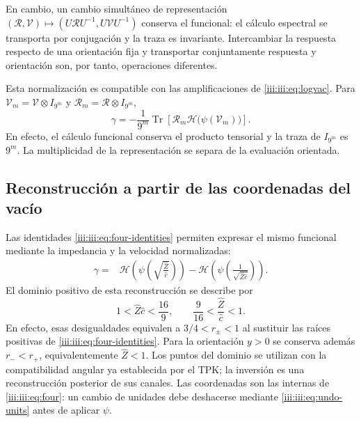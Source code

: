 En cambio, un cambio simultáneo de representación
$(\mathcal R,\mathcal V)\mapsto
(U\mathcal RU^{-1},U\mathcal VU^{-1})$ conserva el funcional:
el cálculo espectral se transporta por conjugación y la traza es
invariante. Intercambiar la respuesta respecto de una orientación fija
y transportar conjuntamente respuesta y orientación son, por tanto,
operaciones diferentes.

Esta normalización es compatible con las amplificaciones de
\eqref{iii:iii:eq:logvac}. Para
$\mathcal V_m=\mathcal V\otimes I_{9^m}$ y
$\mathcal R_m=\mathcal R\otimes I_{9^m}$,
\begin{equation}
 \gamma=-\frac1{9^m}\operatorname{Tr}
 \left[\mathcal R_m\mathcal H\bigl(\psi(\mathcal V_m)\bigr)\right].
 \label{iii:iii:eq:barbero-amplification}
\end{equation}
En efecto, el cálculo funcional conserva el producto tensorial y la traza
de $I_{9^m}$ es $9^m$. La multiplicidad de la representación se separa
de la evaluación orientada.

\subsection{Reconstrucción a partir de las coordenadas del vacío}

Las identidades \eqref{iii:iii:eq:four-identities} permiten expresar el mismo
funcional mediante la impedancia y la velocidad normalizadas:
\begin{align}
 \gamma={}&
 \mathcal H\!\left(\psi\!\left(
     \sqrt{\frac{\widehat Z}{\widehat c}}\right)\right)
 -\mathcal H\!\left(\psi\!\left(
     \frac1{\sqrt{\widehat Z\widehat c}}\right)\right).
 \label{iii:iii:eq:barbero-zc}
\end{align}
El dominio positivo de esta reconstrucción se describe por
\begin{equation}
 1<\widehat Z\widehat c<\frac{16}{9},\qquad
 \frac9{16}<\frac{\widehat Z}{\widehat c}<1.
 \label{iii:iii:eq:barbero-zc-domain}
\end{equation}
En efecto, esas desigualdades equivalen a
$3/4<r_\pm<1$ al sustituir las raíces positivas de
\eqref{iii:iii:eq:four-identities}. Para la orientación $y>0$ se conserva
además $r_-<r_+$, equivalentemente $\widehat Z<1$. Los puntos del
dominio se utilizan con la compatibilidad angular ya establecida por
el TPK; la inversión es una reconstrucción posterior de sus canales.
Las coordenadas son las internas de \eqref{iii:iii:eq:four}: un cambio de
unidades debe deshacerse mediante \eqref{iii:iii:eq:undo-units} antes de
aplicar $\psi$.

